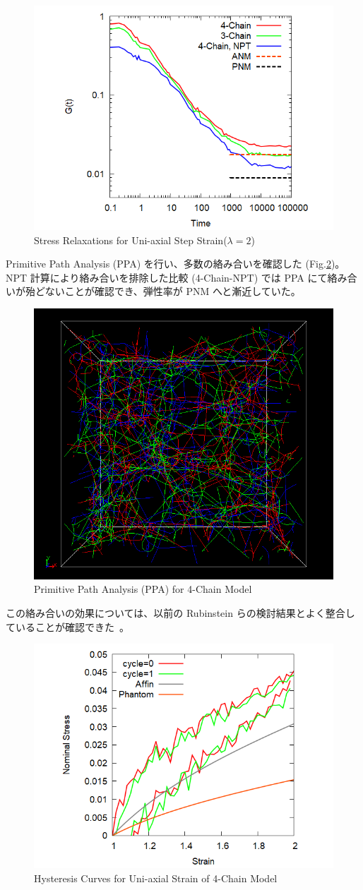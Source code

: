 \documentclass[uplatex,10pt,a4paper,twocolumn]{jsarticle}
\begin{document}
    \begin{figure}[htb]
    \centering
        \includegraphics[width=.42\textwidth]{gt_comp_34.png}
    \caption{Stress Relaxations for Uni-axial Step Strain($\lambda=2$)}
    \label{fig:stress_rel}
    \end{figure}

    Primitive Path Analysis (PPA) を行い、多数の絡み合いを確認した (Fig.\ref{fig:ppa})。
    NPT 計算により絡み合いを排除した比較 (4-Chain-NPT) では PPA にて絡み合いが殆どないことが確認でき、弾性率が PNM へと漸近していた。
    
    \begin{figure}[htb]
    \centering
        \includegraphics[width=.34\textwidth]{N48_f4_PPA.png}
    \caption{Primitive Path Analysis (PPA) for 4-Chain Model}
    \label{fig:ppa}
    \end{figure}

    この絡み合いの効果については、以前の Rubinstein らの検討結果とよく整合していることが確認できた~\cite{Rubinstein2002}。

    \begin{figure}[htb]
        \centering
            \includegraphics[width=.42\textwidth]{hyst_4Chain.png}
        \caption{Hysteresis Curves for Uni-axial Strain of 4-Chain Model}
        \label{fig:hyst}
        \end{figure}
\end{document}
